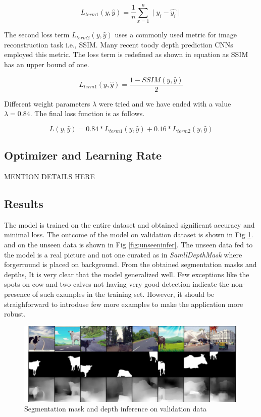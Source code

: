 \documentclass[review]{cvpr}
\begin{document}
\begin{equation}
L_{term1}(y, \hat{y}) = \frac{1}{n} \sum_{x=1}^{n} \mid y_i - \hat{y_i} \mid
\end{equation}

The second loss term $L_{term2}(y, \hat{y})$ uses a commonly used metric for image reconstruction task i.e., SSIM. 
Many recent toody depth prediction CNNs employed this metric. 
The loss term is redefined as shown in equation as SSIM has an upper bound of one.

\begin{equation}
L_{term1}(y, \hat{y}) = \frac{1 - SSIM(y, \hat{y})}{2}
\end{equation}

Different weight parameters $\lambda$ were tried and we have ended with a value $\lambda = 0.84$. The final loss function is as follows.

\begin{equation}
L(y, \hat{y}) = 0.84 \ast L_{term1}(y, \hat{y}) + 0.16 \ast L_{term2}(y, \hat{y})
\end{equation}

\subsection{Optimizer and Learning Rate}
MENTION DETAILS HERE

\subsection{Results}
The model is trained on the entire dataset and obtained significant accuracy and minimal loss. The outcome of the model on validation dataset is shown in Fig \ref{fig:validinfer}. and on the unseen data is shown in Fig \ref{fig:unseeninfer}. The unseen data fed to the model is a real picture and not one curated as in \textit{SamllDepthMask} where forgerround is placed on background. From the obtained segmentation masks and depths, It is very clear that the model generalized well. Few exceptions like the spots on cow and two calves not having very good detection indicate the non-presence of such examples in the training set. However, it should be straighforward to introduse few more examples to make the application more robust.

\begin{figure}
  \begin{center}
    \includegraphics[width=1\textwidth]{validinference.png}
  \end{center}
  \caption{Segmentation mask and depth inference on validation data}
  \label{fig:validinfer}
\end{figure}
\end{document}
